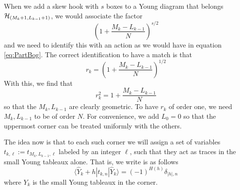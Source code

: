 \documentclass[12pt,nofootinbib, longbibliography]{revtex4-1}
\newcommand\ket[1]{| #1\rangle}
\newcommand\bra[1]{\langle #1|}
\begin{document}
When we add a skew hook with $s$ boxes to a Young diagram that belongs  ${\cal H}_{(M_k+1, L_{k-1}+1)}$, we would associate the factor
\begin{equation}
\left(1+\frac{M_k-L_{k-1}}N\right)^{s/2}
\end{equation}
and we need to identify this with an action as we would have in equation \eqref{eq:PartBog}. The correct identification to have a match is that 
\begin{equation}
r_k= \left(1+\frac{M_k-L_{k-1}}N\right)^{1/2}
\end{equation}
With this, we find that 
\begin{equation}
r_k^2 =1+\frac{M_k-L_{k-1}}N
\end{equation}
so that the $M_k, L_{k-1}$ are clearly geometric. To have $r_k$ of order one, we need $M_k, L_{k-1}$ to be of order $N$. For convenience, we add $L_0=0$ so that the uppermost corner  can be treated uniformly with the others.


The idea now is that to each such corner we will assign a set of variables $ t_{k,\ell} := t_{M_k, L_{k-1},\ell}$ labeled by an integer $\ell$, such that they act as traces in the small Young tableaux alone. That is, we write is as follows
\begin{equation}
\bra{\hat Y_k+h} t_{k,n} \ket{\hat Y_k} = (-1)^{H(h)} \delta_{|h|,n}\label{eq:subYT}
\end{equation}
where $Y_k$ is the small Young tableaux in the corner.
\end{document}
